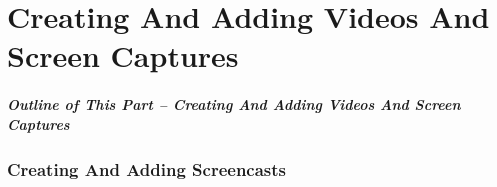 \newpage
\part{Creating And Adding Videos And Screen Captures}
\label{part:CreatingAndAddingVideosAndScreenCaptures}

\begin{latexonly}
\begin{presentationMode}
\begin{frame}[fragile,plain,label=Part0]
\frametitle{Outline of This Part -- Creating And Adding Videos And Screen Captures}
\tableofcontents[sectionstyle=show,subsectionstyle=show]
\end{frame}
\end{presentationMode}
\end{latexonly}



\begin{comment}
*  [[elisp:(org-cycle)][| ]] [[elisp:(org-show-subtree)][|=]] [[elisp:(show-children 10)][|V]] [[elisp:(bx:orgm:indirectBufOther)][|>]] [[elisp:(bx:orgm:indirectBufMain)][|I]] [[elisp:(blee:ppmm:org-mode-toggle)][|N]] [[elisp:(org-top-overview)][|O]] [[elisp:(progn (org-shifttab) (org-content))][|C]] [[elisp:(delete-other-windows)][|1]]  /Section/   Creating And Adding Screencasts ::  [[elisp:(org-cycle)][| ]]
\end{comment}

\section{Creating And Adding Screencasts}


\begin{comment}
*****  [[elisp:(org-cycle)][| ]]  [[elisp:(blee:ppmm:org-mode-toggle)][Nat]] [[elisp:(beginning-of-buffer)][Top]] [[elisp:(delete-other-windows)][(1)]] || /Frame/ *Label=CreatingAndAddingScreencasts*  Creating And Adding Screencasts ::  [[elisp:(org-cycle)][| ]]
\end{comment}

